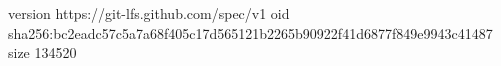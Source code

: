 version https://git-lfs.github.com/spec/v1
oid sha256:bc2eadc57c5a7a68f405c17d565121b2265b90922f41d6877f849e9943c41487
size 134520
